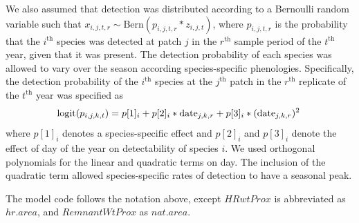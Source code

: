 \documentclass{article}\usepackage[]{graphicx}\usepackage[]{color}
\begin{document}
We also assumed that detection was distributed according to a Bernoulli random variable such that $x_{i,j,t,r} \sim \mathrm{Bern}(p_{i,j,t,r}*z_{i,j,t})$, where $p_{i,j,t,r}$ is the
probability that the $i^{\mathrm{th}}$ species was detected at patch
$j$ in the $r^{\mathrm{th}}$ sample period of the $t^{\mathrm{th}}$
year, given that it was present. The detection probability of each species was allowed to vary over the season
according species-specific phenologies. Specifically, the detection
probability of the $i^{\mathrm{th}}$ species at the $j^{\mathrm{th}}$
patch in the $r^{\mathrm{th}}$ replicate of the $t^{\mathrm{th}}$ year
was specified as
%
\begin{equation}
\label{eq:detection}
\mathrm{logit}(p_{i,j,k,t}) = p[1]_i +
p[2]_i * \mathrm{date}_{j,k,r} +
p[3]_i * (\mathrm{date}_{j,k,r})^2\hspace{0.2em}
\end{equation}
%
where $p[1]_i$ denotes a species-specific effect and $p[2]_i$ and
$p[3]_i$ denote the effect of day of the year on detectability of
species $i$.  We used orthogonal polynomials for the linear and
quadratic terms on day. The inclusion of the quadratic term allowed
species-specific rates of detection to have a seasonal peak.


The model code follows the notation above, except $HRwtProx$ is
abbreviated as $hr.area$, and $RemnantWtProx$ as $nat.area$. 
\end{document}
